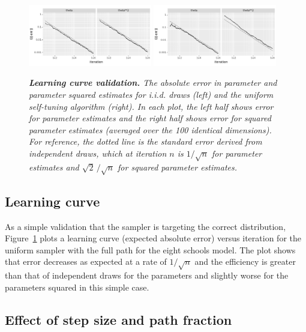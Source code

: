 \documentclass[letterpaper,11pt]{article}
\theoremstyle{plain}%
\theoremstyle{remark}
\begin{document}
\begin{figure}[t]
    \centering
\includegraphics[width=0.48\textwidth]{img/results/uniform/learning_curve_iid.pdf}
\hfill
\includegraphics[width=0.48\textwidth]{img/results/uniform/learning_curve_uniform_full_100D.pdf}
\vspace*{-9pt}
\caption{\it {\bfseries Learning curve validation.} The absolute error in parameter and parameter squared estimates for i.i.d. draws (left) and the uniform self-tuning algorithm (right).  In each plot, the left half shows error for parameter estimates and the right half shows error for squared parameter estimates (averaged over the 100 identical dimensions).  For reference, the dotted line is the standard error derived from independent draws, which at iteration $n$ is $1 / \sqrt{n}$ for parameter estimates and $\sqrt{2}\, / \sqrt{n}$ for squared parameter estimates.}
\label{fig:learning-curve}
\end{figure}

\subsection{Learning curve}

As a simple validation that the sampler is targeting the correct distribution, Figure~\ref{fig:learning-curve} plots a learning curve (expected absolute error) versus iteration for the uniform sampler with the full path for the eight schools model. The plot shows that error decreases as expected at a rate of $1 / \sqrt{n}$ and the efficiency is greater than that of independent draws for the parameters and slightly worse for the parameters squared in this simple case.


\subsection{Effect of step size and path fraction}
\end{document}
